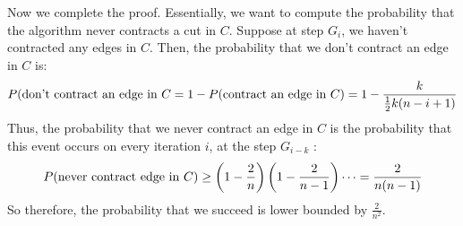 \begin{itemize}
		 Now we complete the proof. Essentially, we want to compute the probability that the algorithm never contracts a cut 
		 in \( C \). Suppose at step \( G_i \), we haven't contracted any edges in \( C \). Then, the probability 
		 that we don't contract an edge in \( C \) is:
		 \[
		 	P(\text{don't contract an edge in \( C \)} = 1-P(\text{contract an edge in \( C \)}) 
			= 1 - \frac{k}{\frac{1}{2}k (n - i + 1)}
		\]
		Thus, the probability that we never contract an edge in \( C \) is the probability that this event occurs on every 
		iteration \( i \), at the step \( G_{i - k} \) :
		\[
		P(\text{never contract edge in  \( C \)}) \ge  \left( 1 - \frac{2}{n} \right) \left( 1 - \frac{2}{n-1} \right) \dots 
		= \frac{2}{n(n-1)}
		\] 
		So therefore, the probability that we succeed is lower bounded by \( \frac{2}{n^2} \).
\end{itemize}